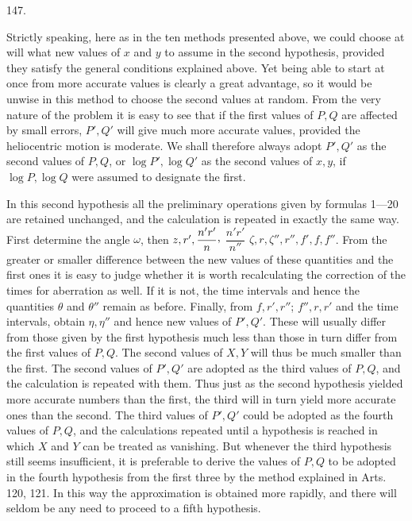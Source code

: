 \par{}\medskip
\begin{center}\hypertarget{native-197-article147}{}147.\end{center}
Strictly speaking, here as in the ten methods presented above, we could choose at will what new values of $x$ and $y$ to assume in the second hypothesis, provided they satisfy the general conditions explained above. Yet being able to start at once from more accurate values is clearly a great advantage, so it would be unwise in this method to choose the second values at random. From the very nature of the problem it is easy to see that if the first values of $P,Q$ are affected by small errors, $P',Q'$ will give much more accurate values, provided the heliocentric motion is moderate. We shall therefore always adopt $P',Q'$ as the second values of $P,Q$, or $\log P',\log Q'$ as the second values of $x,y$, if $\log P,\log Q$ were assumed to designate the first.

In this second hypothesis all the preliminary operations given by formulas 1—20 are retained unchanged, and the calculation is repeated in exactly the same way. First determine the angle $\omega$, then $z,r',\dfrac{n'r'}{n}\mathpunct{\raisebox{.45ex}{,}}$ $\dfrac{n'r'}{n''}$
$\zeta,r,\zeta'',r'',f',f,f''$. From the greater or smaller difference between the new values of these quantities and the first ones it is easy to judge whether it is worth recalculating the correction of the times for aberration as well. If it is not, the time intervals and hence the quantities $\theta$ and $\theta''$ remain as before. Finally, from $f,r',r''$; $f'',r,r'$ and the time intervals, obtain $\eta,\eta''$ and hence new values of $P',Q'$. These will usually differ from those given by the first hypothesis much less than those in turn differ from the first values of $P,Q$. The second values of $X,Y$ will thus be much
smaller than the first. The second values of $P',Q'$ are adopted as the third values of $P,Q$, and the calculation is repeated with them.
Thus just as the second hypothesis yielded more accurate numbers than the first, the third will in turn yield more accurate ones than the second. The third values of $P',Q'$ could be adopted as the fourth values of $P,Q$, and the calculations repeated until a hypothesis is reached in which $X$ and $Y$ can be treated as vanishing. But whenever the third hypothesis still seems insufficient, it is preferable to derive the values of $P,Q$ to be adopted in the fourth hypothesis from the first three by the method explained in Arts. 120, 121. In this way the approximation is obtained more rapidly, and there will seldom be any need to proceed to a fifth hypothesis.

